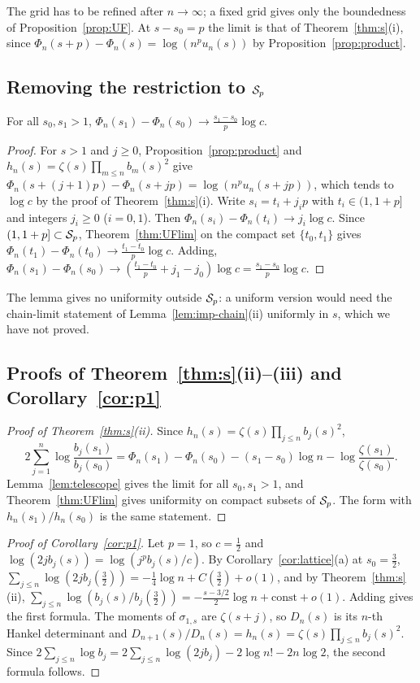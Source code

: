 The grid has to be refined after $n\to\infty$; a fixed grid gives only the boundedness of Proposition~\ref{prop:UF}.
At $s-s_0=p$ the limit is that of Theorem~\ref{thm:s}(i), since $\Phi_n(s+p)-\Phi_n(s)=\log(n^pu_n(s))$ by
Proposition~\ref{prop:product}.

\subsection{Removing the restriction to \texorpdfstring{$\mathcal{S}_p$}{the window}}

\begin{lemma}\label{lem:telescope}
For all $s_0,s_1>1$, $\Phi_n(s_1)-\Phi_n(s_0)\to\frac{s_1-s_0}p\log c$.
\end{lemma}

\begin{proof}
For $s>1$ and $j\ge0$, Proposition~\ref{prop:product} and $h_n(s)=\zeta(s)\prod_{m\le n}b_m(s)^2$ give
$\Phi_n(s+(j+1)p)-\Phi_n(s+jp)=\log(n^pu_n(s+jp))$, which tends to $\log c$ by the proof of Theorem~\ref{thm:s}(i).
Write $s_i=t_i+j_ip$ with $t_i\in(1,1+p]$ and integers $j_i\ge0$ ($i=0,1$). Then
$\Phi_n(s_i)-\Phi_n(t_i)\to j_i\log c$. Since $(1,1+p]\subset\mathcal{S}_p$, Theorem~\ref{thm:UFlim} on the compact set
$\{t_0,t_1\}$ gives $\Phi_n(t_1)-\Phi_n(t_0)\to\frac{t_1-t_0}p\log c$. Adding,
$\Phi_n(s_1)-\Phi_n(s_0)\to(\frac{t_1-t_0}p+j_1-j_0)\log c=\frac{s_1-s_0}p\log c$.
\end{proof}

The lemma gives no uniformity outside $\mathcal{S}_p$: a uniform version would need the chain-limit statement of
Lemma~\ref{lem:imp-chain}(ii) uniformly in $s$, which we have not proved.

\subsection{Proofs of Theorem~\ref{thm:s}(ii)--(iii) and Corollary~\ref{cor:p1}}

\begin{proof}[Proof of Theorem~\ref{thm:s}\textup{(ii)}]
Since $h_n(s)=\zeta(s)\prod_{j\le n}b_j(s)^2$,
\[
  2\sum_{j=1}^n\log\frac{b_j(s_1)}{b_j(s_0)}=\Phi_n(s_1)-\Phi_n(s_0)-(s_1-s_0)\log n-\log\frac{\zeta(s_1)}{\zeta(s_0)} .
\]
Lemma~\ref{lem:telescope} gives the limit for all $s_0,s_1>1$, and Theorem~\ref{thm:UFlim} gives uniformity on compact
subsets of $\mathcal{S}_p$. The form with $h_n(s_1)/h_n(s_0)$ is the same statement.
\end{proof}

\begin{proof}[Proof of Corollary~\ref{cor:p1}]
Let $p=1$, so $c=\frac12$ and $\log(2jb_j(s))=\log(j^pb_j(s)/c)$. By Corollary~\ref{cor:lattice}(a) at $s_0=\frac32$,
$\sum_{j\le n}\log(2jb_j(\frac32))=-\frac14\log n+C(\frac32)+o(1)$, and by Theorem~\ref{thm:s}(ii),
$\sum_{j\le n}\log(b_j(s)/b_j(\frac32))=-\frac{s-3/2}2\log n+\mathrm{const}+o(1)$. Adding gives the first formula. The
moments of $\sigma_{1,s}$ are $\zeta(s+j)$, so $D_n(s)$ is its $n$-th Hankel determinant and
$D_{n+1}(s)/D_n(s)=h_n(s)=\zeta(s)\prod_{j\le n}b_j(s)^2$. Since
$2\sum_{j\le n}\log b_j=2\sum_{j\le n}\log(2jb_j)-2\log n!-2n\log2$, the second formula follows.
\end{proof}

